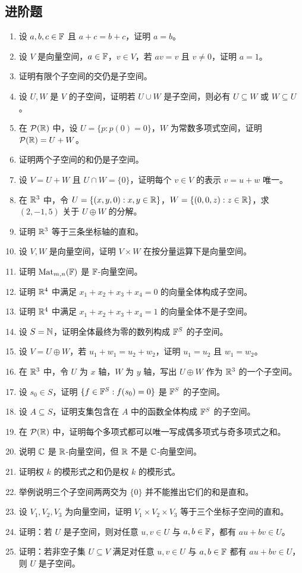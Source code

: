 \subsection*{进阶题} \begin{enumerate}[label=\textbf{\arabic*.},start=21]
\item \medium 设 $a,b,c\in\mathbb{F}$ 且 $a+c=b+c$，证明 $a=b$。 \item \medium 设 $V$ 是向量空间，$a\in\mathbb{F}$，$v\in V$，若 $av=v$ 且 $v\neq 0$，证明 $a=1$。
\item \medium 证明有限个子空间的交仍是子空间。 \item \medium 设 $U,W$ 是 $V$ 的子空间，证明若 $U\cup W$ 是子空间，则必有 $U\subseteq W$ 或 $W\subseteq U$。
\item \medium 在 $\mathcal{P}(\mathbb{R})$ 中，设 $U=\{p:p(0)=0\}$，$W$ 为常数多项式空间，证明 $\mathcal{P}(\mathbb{R})=U+W$。 \item \medium 证明两个子空间的和仍是子空间。
\item \medium 设 $V=U+W$ 且 $U\cap W=\{0\}$，证明每个 $v\in V$ 的表示 $v=u+w$ 唯一。 \item \medium 在 $\mathbb{R}^3$ 中，令 $U=\{(x,y,0):x,y\in\mathbb{R}\}$，$W=\{(0,0,z):z\in\mathbb{R}\}$，求 $(2,-1,5)$ 关于 $U\oplus W$ 的分解。
\item \medium 证明 $\mathbb{R}^3$ 等于三条坐标轴的直和。 \item \medium 设 $V,W$ 是向量空间，证明 $V\times W$ 在按分量运算下是向量空间。
\item \medium 证明 $\mathrm{Mat}_{m,n}(\mathbb{F})$ 是 $\mathbb{F}$-向量空间。 \item \medium 证明 $\mathbb{R}^4$ 中满足 $x_1+x_2+x_3+x_4=0$ 的向量全体构成子空间。
\item \medium 证明 $\mathbb{R}^4$ 中满足 $x_1+x_2+x_3+x_4=1$ 的向量全体不是子空间。 \item \medium 设 $S=\mathbb{N}$，证明全体最终为零的数列构成 $\mathbb{F}^S$ 的子空间。
\item \medium 设 $V=U\oplus W$，若 $u_1+w_1=u_2+w_2$，证明 $u_1=u_2$ 且 $w_1=w_2$。 \item \medium 在 $\mathbb{R}^3$ 中，令 $U$ 为 $x$ 轴，$W$ 为 $y$ 轴，写出 $U\oplus W$ 作为 $\mathbb{R}^3$ 的一个子空间。
\item \medium 设 $s_0\in S$，证明 $\{f\in\mathbb{F}^S:f(s_0)=0\}$ 是 $\mathbb{F}^S$ 的子空间。 \item \medium 设 $A\subseteq S$，证明支集包含在 $A$ 中的函数全体构成 $\mathbb{F}^S$ 的子空间。
\item \medium 在 $\mathcal{P}(\mathbb{R})$ 中，证明每个多项式都可以唯一写成偶多项式与奇多项式之和。 \item \medium 说明 $\mathbb{C}$ 是 $\mathbb{R}$-向量空间，但 $\mathbb{R}$ 不是 $\mathbb{C}$-向量空间。
\item \medium 证明权 $k$ 的模形式之和仍是权 $k$ 的模形式。 \item \medium 举例说明三个子空间两两交为 $\{0\}$ 并不能推出它们的和是直和。
\item \medium 设 $V_1,V_2,V_3$ 为向量空间，证明 $V_1\times V_2\times V_3$ 等于三个坐标子空间的直和。 \item \medium 证明：若 $U$ 是子空间，则对任意 $u,v\in U$ 与 $a,b\in\mathbb{F}$，都有 $au+bv\in U$。
\item \medium 证明：若非空子集 $U\subseteq V$ 满足对任意 $u,v\in U$ 与 $a,b\in\mathbb{F}$ 都有 $au+bv\in U$，则 $U$ 是子空间。 \end{enumerate}


